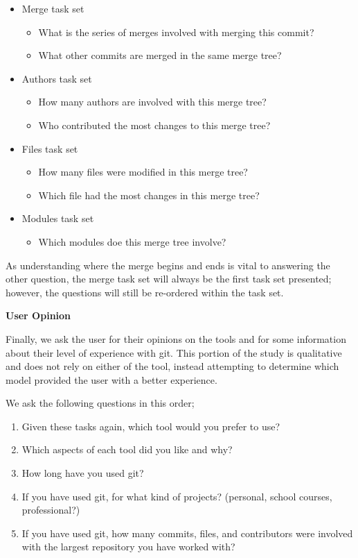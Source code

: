 \begin{itemize}
  \item Merge task set
    \begin{itemize}
      \item What is the series of merges involved with merging this
        commit?
      \item What other commits are merged in the same merge tree?
    \end{itemize}

  \item Authors task set
    \begin{itemize}
      \item How many authors are involved with this merge tree?
      \item Who contributed the most changes to this merge tree?
    \end{itemize}

  \item Files task set
    \begin{itemize}
      \item How many files were modified in this merge tree?
      \item Which file had the most changes in this merge tree?
    \end{itemize}

  \item Modules task set
    \begin{itemize}
      \item Which modules doe this merge tree involve?
    \end{itemize}
\end{itemize}

As understanding where the merge begins and ends is vital to answering
the other question, the merge task set will always be the first task set
presented; however, the questions will still be re-ordered within the
task set.

\textbf{User Opinion}

Finally, we ask the user for their opinions on the tools and for some
information about their level of experience with git. This portion of
the study is qualitative and does not rely on either of the tool,
instead attempting to determine which model provided the user with a
better experience.

We ask the following questions in this order;

\begin{enumerate}
  \item Given these tasks again, which tool would you prefer to use?
  \item Which aspects of each tool did you like and why?
  \item How long have you used git?
  \item If you have used git, for what kind of projects? (personal,
    school courses, professional?)
  \item If you have used git, how many commits, files, and contributors
    were involved with the largest repository you have worked with?
\end{enumerate}


